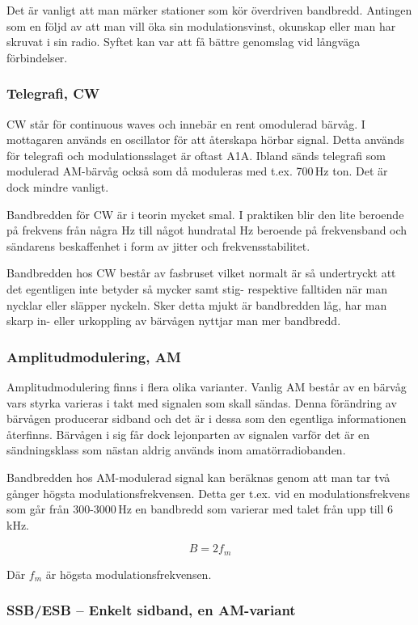 Det är vanligt att man märker stationer som kör överdriven bandbredd. Antingen
som en följd av att man vill öka sin modulationsvinst, okunskap eller man har
skruvat i sin radio. Syftet kan var att få bättre genomslag vid långväga
förbindelser.

\subsubsection{Telegrafi, CW}

CW står för continuous waves och innebär en rent omodulerad bärvåg. I
mottagaren används en oscillator för att återskapa hörbar signal. Detta
används för telegrafi och modulationsslaget är oftast A1A. Ibland sänds
telegrafi som modulerad AM-bärvåg också som då moduleras med t.ex. 700\,Hz
ton. Det är dock mindre vanligt.

Bandbredden för CW är i teorin mycket smal. I praktiken blir den lite beroende
på frekvens från några Hz till något hundratal Hz beroende på frekvensband och
sändarens beskaffenhet i form av jitter och frekvensstabilitet.

Bandbredden hos CW består av fasbruset vilket normalt är så undertryckt att
det egentligen inte betyder så mycker samt stig- respektive falltiden när man
nycklar eller släpper nyckeln. Sker detta mjukt är bandbredden låg, har man
skarp in- eller urkoppling av bärvågen nyttjar man mer bandbredd.

\subsubsection{Amplitudmodulering, AM}

Amplitudmodulering finns i flera olika varianter. Vanlig AM består av en
bärvåg vars styrka varieras i takt med signalen som skall sändas. Denna
förändring av bärvågen producerar sidband och det är i dessa som den egentliga
informationen återfinns. Bärvågen i sig får dock lejonparten av signalen
varför det är en sändningsklass som nästan aldrig används inom
amatörradiobanden.

Bandbredden hos AM-modulerad signal kan beräknas genom att man tar två gånger
högsta modulationsfrekvensen. Detta ger t.ex. vid en modulationsfrekvens som
går från 300-3000\,Hz en bandbredd som varierar med talet från upp till
6\,kHz.

$$B=2f_m$$

Där $f_m$ är högsta modulationsfrekvensen.

\subsubsection{SSB/ESB -- Enkelt sidband, en AM-variant}

